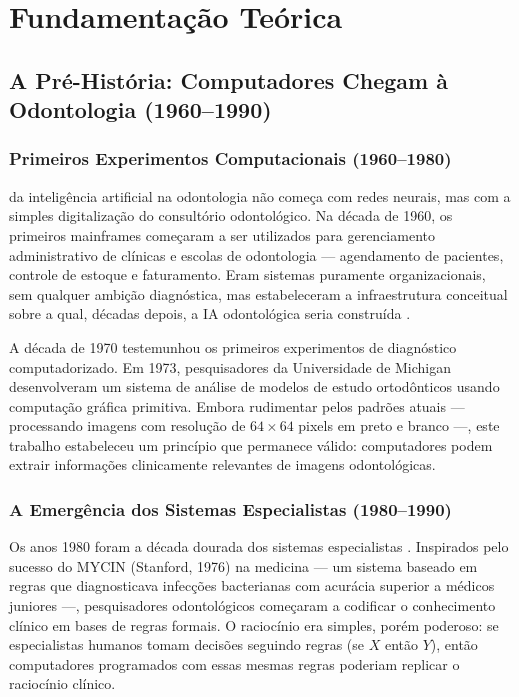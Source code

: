 \section{Fundamentação Teórica}

\subsection{A Pré-História: Computadores Chegam à Odontologia (1960--1990)}

\subsubsection{Primeiros Experimentos Computacionais (1960--1980)}

 da inteligência artificial na odontologia não começa com redes neurais, mas com a simples digitalização do consultório odontológico. Na década de 1960, os primeiros mainframes começaram a ser utilizados para gerenciamento administrativo de clínicas e escolas de odontologia — agendamento de pacientes, controle de estoque e faturamento. Eram sistemas puramente organizacionais, sem qualquer ambição diagnóstica, mas estabeleceram a infraestrutura conceitual sobre a qual, décadas depois, a IA odontológica seria construída .

A década de 1970 testemunhou os primeiros experimentos de diagnóstico computadorizado. Em 1973, pesquisadores da Universidade de Michigan desenvolveram um sistema de análise de modelos de estudo ortodônticos usando computação gráfica primitiva. Embora rudimentar pelos padrões atuais — processando imagens com resolução de $64 \times 64$ pixels em preto e branco —, este trabalho estabeleceu um princípio que permanece válido: computadores podem extrair informações clinicamente relevantes de imagens odontológicas.

\subsubsection{A Emergência dos Sistemas Especialistas (1980--1990)}

Os anos 1980 foram a década dourada dos sistemas especialistas . Inspirados pelo sucesso do MYCIN (Stanford, 1976) na medicina — um sistema baseado em regras que diagnosticava infecções bacterianas com acurácia superior a médicos juniores —, pesquisadores odontológicos começaram a codificar o conhecimento clínico em bases de regras formais. O raciocínio era simples, porém poderoso: se especialistas humanos tomam decisões seguindo regras (se $X$ então $Y$), então computadores programados com essas mesmas regras poderiam replicar o raciocínio clínico.

